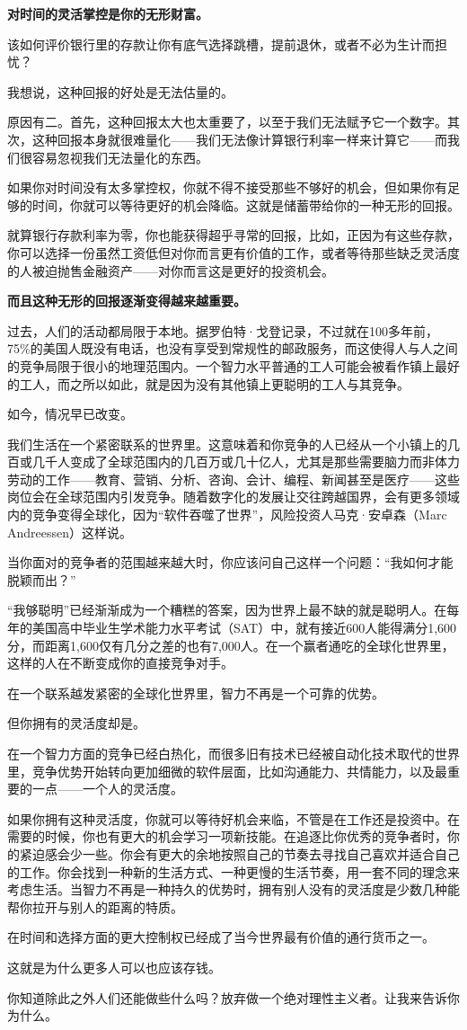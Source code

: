 \textbf{对时间的灵活掌控是你的无形财富。}

该如何评价银行里的存款让你有底气选择跳槽，提前退休，或者不必为生计而担忧？

我想说，这种回报的好处是无法估量的。

原因有二。首先，这种回报太大也太重要了，以至于我们无法赋予它一个数字。其次，这种回报本身就很难量化——我们无法像计算银行利率一样来计算它——而我们很容易忽视我们无法量化的东西。

如果你对时间没有太多掌控权，你就不得不接受那些不够好的机会，但如果你有足够的时间，你就可以等待更好的机会降临。这就是储蓄带给你的一种无形的回报。

就算银行存款利率为零，你也能获得超乎寻常的回报，比如，正因为有这些存款，你可以选择一份虽然工资低但对你而言更有价值的工作，或者等待那些缺乏灵活度的人被迫抛售金融资产——对你而言这是更好的投资机会。

\textbf{而且这种无形的回报逐渐变得越来越重要。}

过去，人们的活动都局限于本地。据罗伯特·戈登记录，不过就在100多年前，75\%的美国人既没有电话，也没有享受到常规性的邮政服务，而这使得人与人之间的竞争局限于很小的地理范围内。一个智力水平普通的工人可能会被看作镇上最好的工人，而之所以如此，就是因为没有其他镇上更聪明的工人与其竞争。

如今，情况早已改变。

我们生活在一个紧密联系的世界里。这意味着和你竞争的人已经从一个小镇上的几百或几千人变成了全球范围内的几百万或几十亿人，尤其是那些需要脑力而非体力劳动的工作——教育、营销、分析、咨询、会计、编程、新闻甚至是医疗——这些岗位会在全球范围内引发竞争。随着数字化的发展让交往跨越国界，会有更多领域内的竞争变得全球化，因为“软件吞噬了世界”，风险投资人马克·安卓森（Marc Andreessen）这样说。

当你面对的竞争者的范围越来越大时，你应该问自己这样一个问题：“我如何才能脱颖而出？”

“我够聪明”已经渐渐成为一个糟糕的答案，因为世界上最不缺的就是聪明人。在每年的美国高中毕业生学术能力水平考试（SAT）中，就有接近600人能得满分1,600分，而距离1,600仅有几分之差的也有7,000人。在一个赢者通吃的全球化世界里，这样的人在不断变成你的直接竞争对手。

在一个联系越发紧密的全球化世界里，智力不再是一个可靠的优势。

但你拥有的灵活度却是。

在一个智力方面的竞争已经白热化，而很多旧有技术已经被自动化技术取代的世界里，竞争优势开始转向更加细微的软件层面，比如沟通能力、共情能力，以及最重要的一点——一个人的灵活度。

如果你拥有这种灵活度，你就可以等待好机会来临，不管是在工作还是投资中。在需要的时候，你也有更大的机会学习一项新技能。在追逐比你优秀的竞争者时，你的紧迫感会少一些。你会有更大的余地按照自己的节奏去寻找自己喜欢并适合自己的工作。你会找到一种新的生活方式、一种更慢的生活节奏，用一套不同的理念来考虑生活。当智力不再是一种持久的优势时，拥有别人没有的灵活度是少数几种能帮你拉开与别人的距离的特质。

在时间和选择方面的更大控制权已经成了当今世界最有价值的通行货币之一。

这就是为什么更多人可以也应该存钱。

你知道除此之外人们还能做些什么吗？放弃做一个绝对理性主义者。让我来告诉你为什么。
